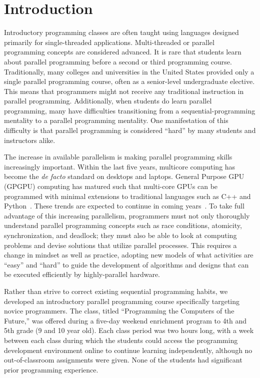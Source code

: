 \documentclass{sig-alternate}
\begin{document}
\section{Introduction}
Introductory programming classes are often taught 
using languages designed primarily for single-threaded applications.  Multi-threaded or
parallel programming concepts are considered advanced. It is rare that students learn about
parallel programming before a second or third programming course.  
Traditionally, many colleges and universities in the United States provided only a single parallel programming course, often as a senior-level undergraduate elective. 
This means that programmers might not receive any traditional instruction in parallel programming.
Additionally, when students do learn parallel programming, many have difficulties transitioning
from a sequential-programming mentality to a parallel programming mentality.
One manifestation of this difficulty is that parallel programming is considered ``hard'' 
by many students and instructors alike.~\cite{parallelExpectations}

The increase in available parallelism is making parallel programming skills increasingly important.  
Within the last five years, multicore computing has become the \emph{de facto} standard on
desktops and laptops.
General Purpose GPU (GPGPU) computing has matured such that multi-core 
GPUs can be programmed with minimal extensions to traditional languages such as C++ and 
Python~\cite{gpgpuLanguages}.  
These trends are expected to continue in coming years~\cite{multicoreTrends}.
To take full advantage of this increasing parallelism,
programmers must not only thoroughly understand parallel programming concepts 
such as race conditions, atomicity, synchronization, and deadlock;
they must also be able to look at computing problems and devise solutions that utilize parallel processes.
This requires a change in mindset as well as practice,
adopting new models of what activities are ``easy'' and ``hard''
to guide the development of algorithms and designs that can be executed efficiently by highly-parallel hardware.

Rather than strive to correct existing sequential programming habits,
we developed an introductory parallel programming course specifically targeting novice programmers.
The class, titled ``Programming the Computers of the Future,'' was offered during a five-day weekend enrichment program to 4th and 5th grade (9 and 10 year old).
Each class period was two hours long, with a week between each class during which the students
could access the programming development environment online to continue learning independently,
although no out-of-classroom assignments were given.
None of the students had significant prior programming experience.
\end{document}
